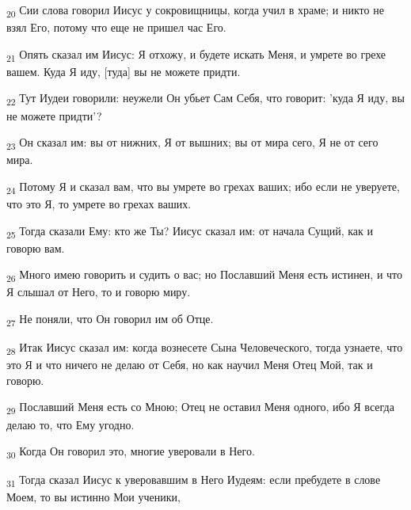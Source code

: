 \begin{tcolorbox}
\textsubscript{20} Сии слова говорил Иисус у сокровищницы, когда учил в храме; и никто не взял Его, потому что еще не пришел час Его.
\end{tcolorbox}
\begin{tcolorbox}
\textsubscript{21} Опять сказал им Иисус: Я отхожу, и будете искать Меня, и умрете во грехе вашем. Куда Я иду, [туда] вы не можете придти.
\end{tcolorbox}
\begin{tcolorbox}
\textsubscript{22} Тут Иудеи говорили: неужели Он убьет Сам Себя, что говорит: 'куда Я иду, вы не можете придти'?
\end{tcolorbox}
\begin{tcolorbox}
\textsubscript{23} Он сказал им: вы от нижних, Я от вышних; вы от мира сего, Я не от сего мира.
\end{tcolorbox}
\begin{tcolorbox}
\textsubscript{24} Потому Я и сказал вам, что вы умрете во грехах ваших; ибо если не уверуете, что это Я, то умрете во грехах ваших.
\end{tcolorbox}
\begin{tcolorbox}
\textsubscript{25} Тогда сказали Ему: кто же Ты? Иисус сказал им: от начала Сущий, как и говорю вам.
\end{tcolorbox}
\begin{tcolorbox}
\textsubscript{26} Много имею говорить и судить о вас; но Пославший Меня есть истинен, и что Я слышал от Него, то и говорю миру.
\end{tcolorbox}
\begin{tcolorbox}
\textsubscript{27} Не поняли, что Он говорил им об Отце.
\end{tcolorbox}
\begin{tcolorbox}
\textsubscript{28} Итак Иисус сказал им: когда вознесете Сына Человеческого, тогда узнаете, что это Я и что ничего не делаю от Себя, но как научил Меня Отец Мой, так и говорю.
\end{tcolorbox}
\begin{tcolorbox}
\textsubscript{29} Пославший Меня есть со Мною; Отец не оставил Меня одного, ибо Я всегда делаю то, что Ему угодно.
\end{tcolorbox}
\begin{tcolorbox}
\textsubscript{30} Когда Он говорил это, многие уверовали в Него.
\end{tcolorbox}
\begin{tcolorbox}
\textsubscript{31} Тогда сказал Иисус к уверовавшим в Него Иудеям: если пребудете в слове Моем, то вы истинно Мои ученики,
\end{tcolorbox}

